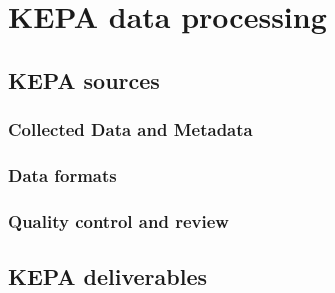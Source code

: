 \chapter{KEPA data processing}
\section{KEPA sources}
\subsection{Collected Data and Metadata}
\subsection{Data formats}
\subsection{Quality control and review}
\section{KEPA deliverables}

